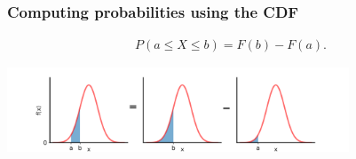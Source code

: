 \documentclass[10pt]{beamer}
\begin{document}
\begin{frame}
\frametitle{Computing probabilities using the CDF}



\vspace{-.9cm}

\begin{align*}
P(a \leq X \leq b) = F(b) - F(a).
\end{align*} 


\vspace{-.7cm}

\center \includegraphics[height=2.5cm]{images/normal_ab_a_b.png}

\vspace{-.5cm}




%

\end{frame}
\end{document}
